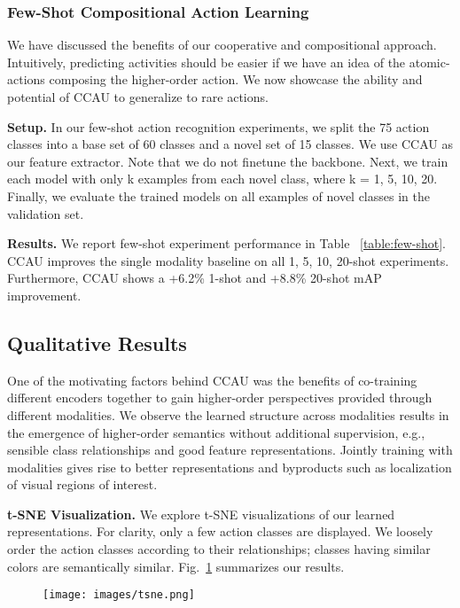 \documentclass[final]{cvpr}
\begin{document}
\subsubsection{Few-Shot Compositional Action Learning}

We have discussed the benefits of our cooperative and compositional approach. Intuitively, predicting activities should be easier if we have an idea of the atomic-actions composing the higher-order action. We now showcase the ability and potential of CCAU to generalize to rare actions.


\noindent\textbf{Setup.} In our few-shot action recognition experiments, we split the 75 action classes into a base set of 60 classes and a novel set of 15 classes. We use CCAU as our feature extractor. Note that we do not finetune the backbone. Next, we train each model with only k examples from each novel class, where k = 1, 5, 10, 20. Finally, we evaluate the trained models on all examples of novel classes in the validation set.

\noindent\textbf{Results.} We report few-shot experiment performance in Table ~\ref{table:few-shot}. CCAU improves the single modality baseline on all 1, 5, 10, 20-shot experiments. Furthermore, CCAU shows a +6.2\% 1-shot and +8.8\% 20-shot mAP improvement.




\subsection{Qualitative Results}

One of the motivating factors behind CCAU was the benefits of co-training different encoders together to gain higher-order perspectives provided through different modalities. We observe the learned structure across modalities results in the emergence of higher-order semantics without additional supervision, e.g., sensible class relationships and good feature representations. Jointly training with modalities gives rise to better representations and byproducts such as localization of visual regions of interest.

\noindent\textbf{t-SNE Visualization.} We explore t-SNE visualizations of our learned representations. For clarity, only a few action classes are displayed. We loosely order the action classes according to their relationships; classes having similar colors are semantically similar. Fig.~\ref{tsne} summarizes our results.

\begin{figure}
\begin{center}
    \centering
    \texttt{[image: images/tsne.png]}
    \vspace{-20pt}
    \label{tsne}
    \vspace{-10mm}
    \centering
\end{center}
\end{figure}
\end{document}
